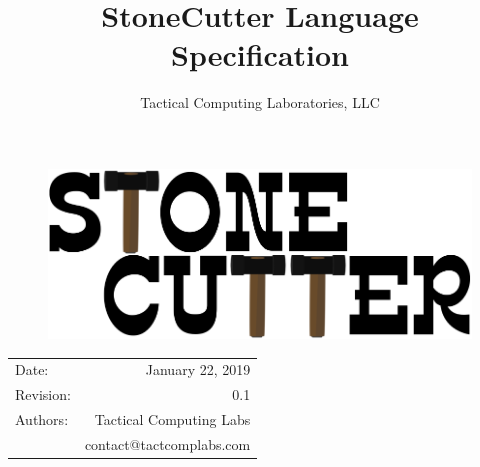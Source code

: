\documentclass{article}
\title{StoneCutter Language\\Specification} %
\author{Tactical Computing Laboratories, LLC} %
\date{} %
\begin{document}
\begin{figure}
\begin{center}
\includegraphics[width=5in]{figures/stonecutter.png} %
\end{center}
\end{figure}

\maketitle %
\thispagestyle{fancy} %

\begin{center}
\begin{tabular}{l r}
Date: & January 22, 2019 \\ %
Revision: & 0.1 \\         %
Authors: & Tactical Computing Labs\\ %
& contact@tactcomplabs.com\\
\end{tabular}
\end{center}



\clearpage
\tableofcontents
\clearpage


\clearpage
\listoffigures
\lstlistoflistings
\listoftables
\clearpage
\end{document}
